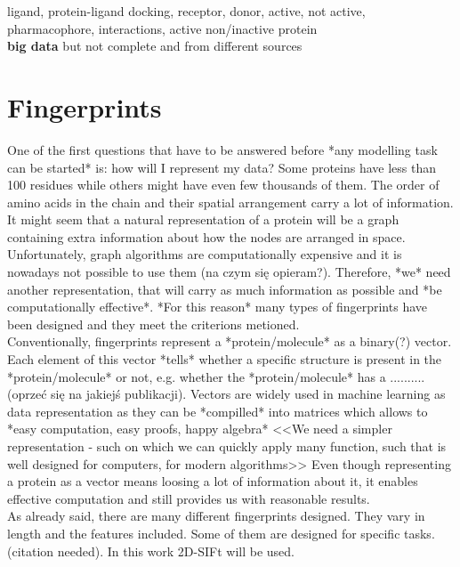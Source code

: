 \documentclass[a4paper,10pt]{report}
\begin{document}
    ligand, protein-ligand docking, receptor, donor, active, not active, pharmacophore, interactions, active non/inactive protein\\ %
    
    \textbf{big data} but not complete and from different sources%
         
    \section{Fingerprints} %
    One of the first questions that have to be answered before *any modelling task can be started* is: how will I represent my data? Some proteins have less than 100 residues while others might have even few thousands of them. The order of amino acids in the chain and their spatial arrangement carry a lot of information. It might seem that a natural representation of a protein will be a graph containing extra information about how the nodes are arranged in space. Unfortunately, graph algorithms are computationally expensive and it is nowadays not possible to use them (na czym się opieram?). Therefore, *we* need another representation, that will carry as much information as possible and *be computationally effective*. *For this reason* many types of fingerprints have been designed and they meet the criterions metioned.\\
    
    Conventionally, fingerprints represent a *protein/molecule* as a binary(?) vector. Each element of this vector *tells* whether a specific structure is present in the *protein/molecule* or not, e.g. whether the *protein/molecule* has a .......... (oprzeć się na jakiejś publikacji). Vectors are widely used in machine learning as data representation as they can be *compilled* into matrices which allows to *easy computation, easy proofs, happy algebra* <<We need a simpler representation - such on which we can quickly apply many function, such that is well designed for computers, for modern algorithms>> Even though representing a protein as a vector means loosing a lot of information about it, it enables effective computation and still provides us with reasonable results.\\
    
    As already said, there are many different fingerprints designed. They vary in length and the features included. Some of them are designed for specific tasks. (citation needed). In this work 2D-SIFt will be used.
  
\end{document}
